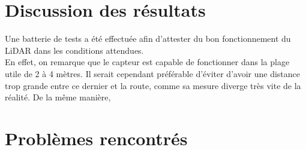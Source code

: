 \section{Discussion des résultats}

Une batterie de tests a été effectuée afin d'attester du bon fonctionnement du LiDAR dans les conditions
attendues.\\
En effet, on remarque que le capteur est capable de fonctionner dans la plage utile de 2 à 
4 mètres. Il serait cependant préférable d'éviter d'avoir une distance trop grande entre ce dernier et 
la route, comme sa mesure diverge très vite de la réalité. De la même manière, 

\section{Problèmes rencontrés}
